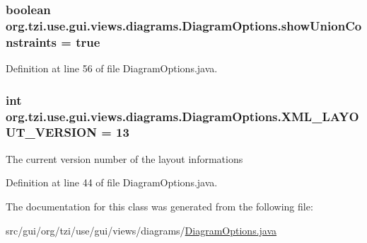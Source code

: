 \hypertarget{classorg_1_1tzi_1_1use_1_1gui_1_1views_1_1diagrams_1_1_diagram_options_aba1d9047a2ee8a0d2c472a38b2a72803}{
\subsubsection[{show\-Union\-Constraints}]{\setlength{\rightskip}{0pt plus 5cm}boolean org.\-tzi.\-use.\-gui.\-views.\-diagrams.\-Diagram\-Options.\-show\-Union\-Constraints = true\hspace{0.3cm}{\ttfamily [protected]}}}\label{classorg_1_1tzi_1_1use_1_1gui_1_1views_1_1diagrams_1_1_diagram_options_aba1d9047a2ee8a0d2c472a38b2a72803}


Definition at line 56 of file Diagram\-Options.\-java.

\hypertarget{classorg_1_1tzi_1_1use_1_1gui_1_1views_1_1diagrams_1_1_diagram_options_ac7fbcc0bc73564310819273293265b29}{
\subsubsection[{X\-M\-L\-\_\-\-L\-A\-Y\-O\-U\-T\-\_\-\-V\-E\-R\-S\-I\-O\-N}]{\setlength{\rightskip}{0pt plus 5cm}int org.\-tzi.\-use.\-gui.\-views.\-diagrams.\-Diagram\-Options.\-X\-M\-L\-\_\-\-L\-A\-Y\-O\-U\-T\-\_\-\-V\-E\-R\-S\-I\-O\-N = 13\hspace{0.3cm}{\ttfamily [static]}}}\label{classorg_1_1tzi_1_1use_1_1gui_1_1views_1_1diagrams_1_1_diagram_options_ac7fbcc0bc73564310819273293265b29}
The current version number of the layout informations 

Definition at line 44 of file Diagram\-Options.\-java.



The documentation for this class was generated from the following file\-:\begin{DoxyCompactItemize}
\item 
src/gui/org/tzi/use/gui/views/diagrams/\hyperlink{_diagram_options_8java}{Diagram\-Options.\-java}\end{DoxyCompactItemize}
